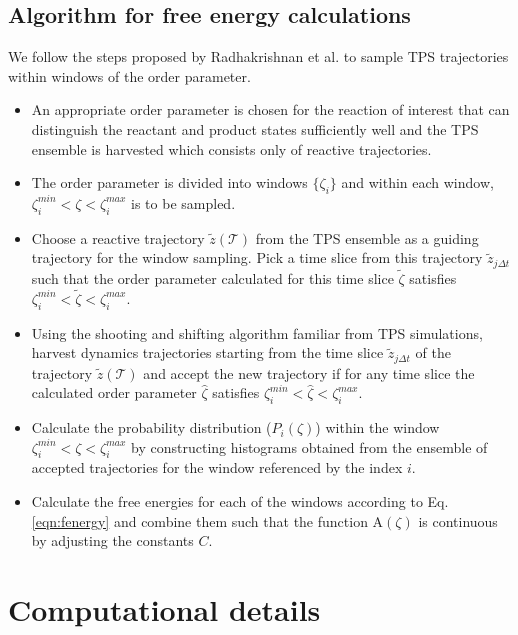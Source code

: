 \documentclass[journal=jpcbfk,manuscript=article,layout=traditional]{achemso}
\begin{document}
\subsection{Algorithm for free energy calculations}\label{ssec:algorithm}
We follow the steps proposed by Radhakrishnan et al. \cite{Radhakrishnan04JChemPhys121p2436} 
to sample TPS trajectories within windows of the order parameter. 
\begin{itemize}
\item An appropriate order parameter is chosen for the reaction of interest 
that can distinguish the reactant and product states sufficiently well and the TPS ensemble is harvested 
which consists only of reactive trajectories.
\item The order parameter is divided into windows $\{\zeta_i\}$ and within each window,
$\zeta_{i}^{min} < \zeta < \zeta_{i}^{max}$ is to be sampled.
\item Choose a reactive trajectory $\tilde{z}(\mathcal{T})$ from the TPS ensemble as 
a guiding trajectory for the window sampling. Pick a time slice from this trajectory 
$\tilde{z}_{j\Delta t}$ such that the order parameter calculated for this time slice
$\tilde{\zeta}$ satisfies $\zeta_{i}^{min} < \tilde{\zeta} < \zeta_{i}^{max}$.
\item Using the shooting and shifting algorithm familiar from TPS simulations, \cite{dellago02AdvChemPhys123}
harvest dynamics trajectories starting from the time slice $\tilde{z}_{j\Delta t}$ of the trajectory 
$\tilde{z}(\mathcal{T})$ and accept the new trajectory if for any time slice the calculated 
order parameter $\hat{\zeta}$ satisfies $\zeta_{i}^{min} < \hat{\zeta} < \zeta_{i}^{max}$.
\item Calculate the probability distribution ($P_i(\zeta)$) within the window $\zeta_{i}^{min} 
< \zeta < \zeta_{i}^{max}$ by constructing histograms obtained from the ensemble of 
accepted trajectories for the window referenced by the index $i$. 
\item Calculate the free energies for each of the windows according to Eq. \ref{eqn:fenergy}
and combine them such that the function $\text{A}(\zeta)$ is continuous 
by adjusting the constants $C$. 
\end{itemize}
\section{Computational details}
\end{document}
